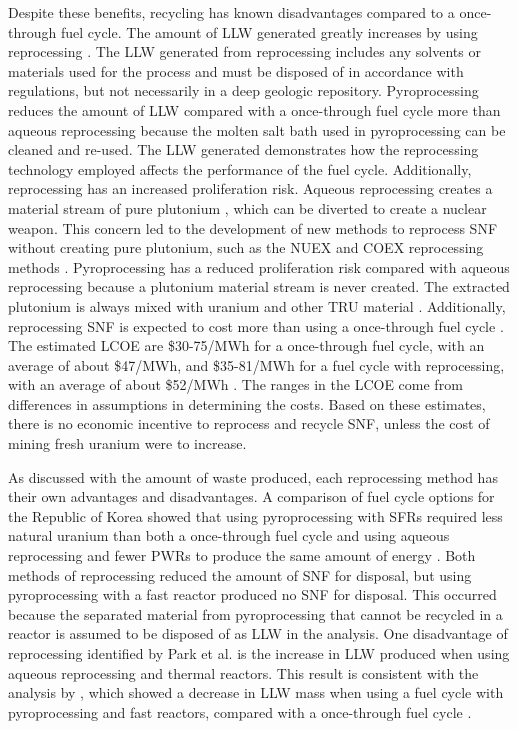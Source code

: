 Despite these benefits, recycling has known disadvantages compared to 
a once-through fuel cycle.
The amount of \gls{LLW} generated greatly increases by using 
reprocessing \cite{widder_benefits_2010}. The \gls{LLW} generated 
from reprocessing includes any solvents or materials used for the process 
and must be disposed of in accordance with regulations, but not 
necessarily in a deep geologic repository.
Pyroprocessing reduces the amount of \gls{LLW} compared with 
a once-through fuel cycle more than aqueous reprocessing because
the molten salt bath used in pyroprocessing can be cleaned 
and re-used. The \gls{LLW} generated demonstrates how the reprocessing 
technology employed affects the performance of the fuel cycle. 
Additionally, reprocessing has an increased 
proliferation risk. Aqueous reprocessing creates a material stream of 
pure plutonium \cite{widder_benefits_2010}, which can be diverted to 
create a nuclear weapon. This concern led to the development of new 
methods to reprocess \gls{SNF} without creating pure plutonium, such 
as the NUEX and COEX reprocessing methods \cite{widder_benefits_2010}. 
Pyroprocessing has a reduced proliferation risk compared with 
aqueous reprocessing
because a plutonium material stream is never created. The extracted 
plutonium is always mixed with uranium and other \gls{TRU} material 
\cite{noauthor_status_2021}.
Additionally, reprocessing \gls{SNF} is expected to cost more than 
using a once-through fuel cycle \cite{rodriguez-penalonga_review_2017,widder_benefits_2010}. 
The estimated 
\gls{LCOE} are \$30-75/MWh for a once-through fuel cycle, with an 
average of about \$47/MWh, and \$35-81/MWh for a fuel 
cycle with reprocessing, with an average of about \$52/MWh 
\cite{widder_benefits_2010}. The ranges in the \gls{LCOE} come from 
differences in assumptions in determining the costs. Based on these 
estimates, there is no economic incentive to reprocess and recycle 
\gls{SNF}, unless the cost of mining fresh uranium were to increase. 

As discussed with the amount of waste produced, each reprocessing method 
has their own advantages and disadvantages. 
A comparison of fuel cycle options for the Republic of Korea 
showed that using pyroprocessing with \glspl{SFR} required less natural 
uranium than both a once-through fuel cycle and using aqueous reprocessing 
and fewer \glspl{PWR} to produce the same amount of energy 
\cite{park_comparative_2011}. Both methods of reprocessing  
reduced the amount of \gls{SNF} for disposal,
but using pyroprocessing with a fast reactor produced no \gls{SNF} for 
disposal. This occurred because the separated material from 
pyroprocessing that cannot be recycled in a reactor is assumed to be 
disposed of as \gls{LLW} in the analysis. One disadvantage of reprocessing 
identified by Park et al. is the increase in \gls{LLW} produced 
when using aqueous reprocessing and 
thermal reactors. This result is consistent with the analysis 
by \cite{widder_benefits_2010}, which showed a decrease in \gls{LLW} 
mass when using a fuel cycle with pyroprocessing and fast reactors, 
compared with a once-through fuel cycle \cite{park_comparative_2011}. 

